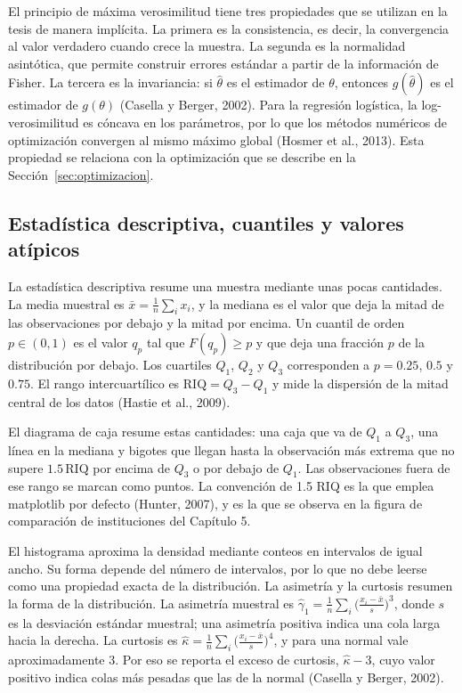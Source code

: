 El principio de máxima verosimilitud tiene tres propiedades que se utilizan en la tesis de manera implícita. La primera es la consistencia, es decir, la convergencia al valor verdadero cuando crece la muestra. La segunda es la normalidad asintótica, que permite construir errores estándar a partir de la información de Fisher. La tercera es la invariancia: si $\hat\theta$ es el estimador de $\theta$, entonces $g(\hat\theta)$ es el estimador de $g(\theta)$ (Casella y Berger, 2002). Para la regresión logística, la log-verosimilitud es cóncava en los parámetros, por lo que los métodos numéricos de optimización convergen al mismo máximo global (Hosmer et al., 2013). Esta propiedad se relaciona con la optimización que se describe en la Sección~\ref{sec:optimizacion}.

\subsection{Estadística descriptiva, cuantiles y valores atípicos}
La estadística descriptiva resume una muestra mediante unas pocas cantidades. La media muestral es $\bar{x}=\frac{1}{n}\sum_i x_i$, y la mediana es el valor que deja la mitad de las observaciones por debajo y la mitad por encima. Un cuantil de orden $p\in(0,1)$ es el valor $q_p$ tal que $F(q_p)\geq p$ y que deja una fracción $p$ de la distribución por debajo. Los cuartiles $Q_1$, $Q_2$ y $Q_3$ corresponden a $p=0.25$, $0.5$ y $0.75$. El rango intercuartílico es $\text{RIQ}=Q_3-Q_1$ y mide la dispersión de la mitad central de los datos (Hastie et al., 2009).

El diagrama de caja resume estas cantidades: una caja que va de $Q_1$ a $Q_3$, una línea en la mediana y bigotes que llegan hasta la observación más extrema que no supere $1.5\,\text{RIQ}$ por encima de $Q_3$ o por debajo de $Q_1$. Las observaciones fuera de ese rango se marcan como puntos. La convención de 1.5 RIQ es la que emplea matplotlib por defecto (Hunter, 2007), y es la que se observa en la figura de comparación de instituciones del Capítulo 5.

El histograma aproxima la densidad mediante conteos en intervalos de igual ancho. Su forma depende del número de intervalos, por lo que no debe leerse como una propiedad exacta de la distribución. La asimetría y la curtosis resumen la forma de la distribución. La asimetría muestral es $\hat{\gamma}_1=\frac{1}{n}\sum_i\big(\frac{x_i-\bar{x}}{s}\big)^3$, donde $s$ es la desviación estándar muestral; una asimetría positiva indica una cola larga hacia la derecha. La curtosis es $\hat{\kappa}=\frac{1}{n}\sum_i\big(\frac{x_i-\bar{x}}{s}\big)^4$, y para una normal vale aproximadamente 3. Por eso se reporta el exceso de curtosis, $\hat{\kappa}-3$, cuyo valor positivo indica colas más pesadas que las de la normal (Casella y Berger, 2002).

